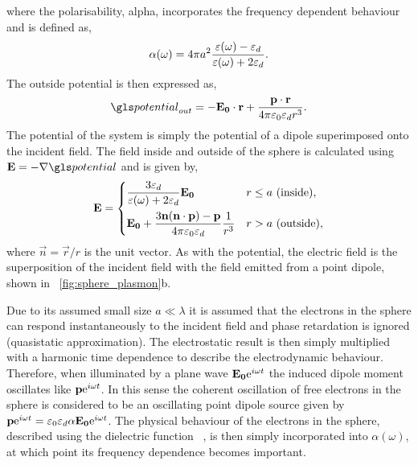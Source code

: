 \documentclass{article}
\begin{document}
where the polarisability, \gls{alpha}, incorporates the frequency dependent behaviour and is defined as,
\begin{equation}
\alpha(\omega) = 4\pi a^2 \frac{\varepsilon(\omega) - \varepsilon_d}{\varepsilon(\omega) + 2\varepsilon_d}.
\label{eq:polarisability}
\end{equation}
The outside potential is then expressed as,
\begin{equation}
\pot_{out} = -\vec{E_0}\cdot\vec{r} + \frac{\vec{p}\cdot\vec{r}}{4\pi\epsfs\epsdi r^3}.
\end{equation}
The potential of the system is simply the potential of a dipole superimposed onto the incident field. The field inside and outside of the sphere is calculated using $\vec{E}=-\nabla\pot$ and is given by,
\begin{equation}
\mathbf{E} =
\begin{dcases}
\frac{3\varepsilon_d}{\varepsilon(\omega)+2\varepsilon_d} \mathbf{E_0} & r \leq a\text{ (inside)}, \\
\mathbf{E_0} + \frac{3\mathbf{n}(\mathbf{n}\cdot\mathbf{p}) - \mathbf{p}}{4\pi\varepsilon_0\varepsilon_d}\frac{1}{r^3} & r > a\text{ (outside)},
\end{dcases}
\label{eq:E_out}
\end{equation}
where $\vec{n}=\vec{r}/r$ is the unit vector. As with the potential, the electric field is the superposition of the incident field with the field emitted from a point dipole, shown in \figurename~\ref{fig:sphere_plasmon}b.

Due to its assumed small size $a\ll\lambda$ it is assumed that the electrons in the sphere can respond instantaneously to the incident field and phase retardation is ignored (quasistatic approximation). The electrostatic result is then simply multiplied with a harmonic time dependence to describe the electrodynamic behaviour. Therefore, when illuminated by a plane wave $\mathbf{E_0}\mathrm{e}^{i\omega t}$ the induced dipole moment oscillates like $\mathbf{p}\mathrm{e}^{i\omega t}$. In this sense the coherent oscillation of free electrons in the sphere is considered to be an oscillating point dipole source given by $\mathbf{p}\mathrm{e}^{i\omega t}=\varepsilon_0\varepsilon_d\alpha\mathbf{E_0}\mathrm{e}^{i\omega t}$. The physical behaviour of the electrons in the sphere, described using the dielectric function \dielectric\ , is then simply incorporated into $\alpha(\omega)$, at which point its frequency dependence becomes important.
\end{document}
